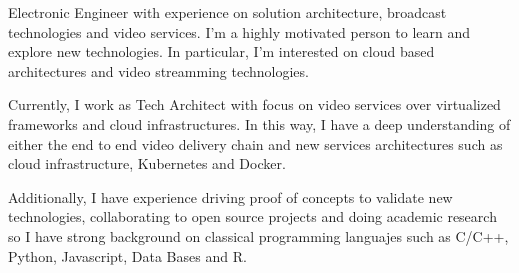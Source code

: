 \par{
    Electronic Engineer with  experience on solution architecture, broadcast technologies and video services. I'm a highly motivated person to learn and explore new technologies. In particular, I'm interested on cloud based architectures and video streamming  technologies.

    Currently, I work as Tech Architect with focus on  video services  over  virtualized frameworks and cloud infrastructures.  In this way, I have a deep understanding of either the end to end video delivery chain and new services architectures such as cloud infrastructure, Kubernetes and Docker.
    
    Additionally, I have experience driving proof of concepts to validate new technologies, collaborating to open source projects and doing academic research so I have strong background on classical programming languajes such as C/C++, Python, Javascript, Data Bases and R.
}